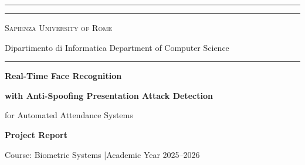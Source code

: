 \documentclass[11pt,a4paper]{article}
\begin{document}

\begin{titlepage}
\centering

\textcolor{sapblue}{\rule{\textwidth}{2pt}}
\vspace{0.18cm}
\textcolor{sapblue}{\rule{\textwidth}{0.5pt}}

\vspace{0.55cm}
{\scshape\Large Sapienza University of Rome\par}
\vspace{0.12cm}
{\normalsize\color{darkgray}
  Dipartimento di Informatica \textbullet{} Department of Computer Science\par}

\vspace{0.55cm}
\textcolor{sapblue}{\rule{\textwidth}{0.5pt}}
\vspace{0.9cm}

\begin{tcolorbox}[
  enhanced,
  colback=sapblue!6!white,
  colframe=sapblue,
  boxrule=2pt,
  arc=10pt,
  width=0.92\textwidth,
  halign=center,
  left=18pt,right=18pt,top=22pt,bottom=22pt,
  shadow={2mm}{-2mm}{0mm}{black!18},
]
{\color{sapblue}\LARGE\bfseries Real-Time Face Recognition\par}
\vspace{6pt}
{\color{sapblue!70!black}\large\bfseries with Anti-Spoofing Presentation Attack Detection\par}
\vspace{6pt}
{\color{darkgray}\normalsize for Automated Attendance Systems\par}
\end{tcolorbox}

\vspace{0.9cm}
{\large\bfseries Project Report\par}
\vspace{0.15cm}
{\normalsize\color{darkgray}Course: Biometric Systems \quad|\quad Academic Year 2025--2026\par}

\vspace{1.1cm}


\end{titlepage}
\end{document}

